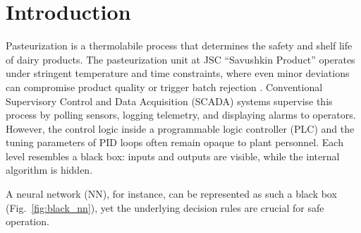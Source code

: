 

\section{Introduction}

Pasteurization is a thermolabile process that determines the safety and shelf
life of dairy products. The pasteurization unit at JSC ``Savushkin Product''
operates under stringent temperature and time constraints, where even minor
deviations can compromise product quality or trigger batch rejection
\cite{ivaniuk2013neuro}. Conventional Supervisory Control and Data Acquisition
(SCADA) systems supervise this process by polling sensors, logging telemetry,
and displaying alarms to operators. However, the control logic inside a
programmable logic controller (PLC) and the tuning parameters of PID loops often
remain opaque to plant personnel. Each level resembles a black box: inputs and
outputs are visible, while the internal algorithm is hidden.

A neural network (NN),
for instance, can be represented as such a black box
(Fig.~\ref{fig:black_nn}), yet the underlying decision rules are crucial for
safe operation.

